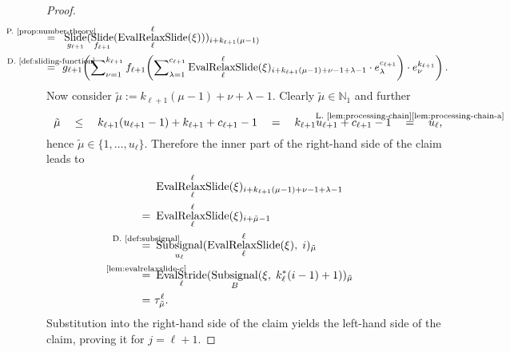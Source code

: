 \documentclass[journal]{IEEEtran}
\newcommand{\N}{\mathbb{N}}
\newcommand{\ROI}{B}
\newcommand{\discint}[2]{\{#1,\dotsc,#2\}}
\newcommand{\inint}[2]{\in\discint{#1}{#2}}
\DeclareMathOperator{\Subsignal}{Subsignal}
\DeclareMathOperator{\Slide}{Slide}
\DeclareMathOperator{\EvalStride}{EvalStride}
\newcommand{\equsing}[1]{\overset{\mathclap{\text{#1}}}{=}}
\DeclareMathOperator{\EvalRelaxSlide}{EvalRelaxSlide}
\begin{document}
\begin{proof}
\begin{align*}
  \equsing{P.~\ref{prop:number-theory}}\ \ & \Slide_{g_{\ell + 1}}(\Slide_{f_{\ell + 1}}(\EvalRelaxSlide_\ell^\ell(\xi)))_{i + k_{\ell + 1}(\mu - 1)}\\
    \equsing{D.~\ref{def:sliding-function}}\ \ & g_{\ell + 1}\!\left( \sum\nolimits_{\nu = 1}^{k_{\ell + 1}} f_{\ell + 1}\!\left( \sum\nolimits_{\lambda = 1}^{c_{\ell + 1}} \EvalRelaxSlide_\ell^\ell(\xi)_{i + k_{\ell + 1}(\mu - 1) + \nu - 1 + \lambda - 1}\cdot e_\lambda^{c_{\ell + 1}} \right) \cdot e_\nu^{k_{\ell + 1}} \right)\text{.}
\end{align*}
Now consider $\tilde{\mu} := k_{\ell + 1}(\mu - 1) + \nu + \lambda - 1$.
Clearly $\tilde{\mu}\in\N_1$ and further
\begin{displaymath}
  \tilde{\mu}
  \ \ \ \leq\ \ \ k_{\ell + 1}(u_{\ell + 1} - 1) + k_{\ell + 1} + c_{\ell + 1} - 1
  \ \ \ =\ \ \ k_{\ell + 1}u_{\ell + 1} + c_{\ell + 1} - 1
  \ \ \ \equsing{L.~\ref{lem:processing-chain}\ref{lem:processing-chain-a}}\ \ \ u_\ell\text{,}
\end{displaymath}
hence $\tilde{\mu}\inint{1}{u_\ell}$.
Therefore the inner part of the right-hand side of the claim leads to
\begin{align*}
  & \EvalRelaxSlide_\ell^\ell(\xi)_{i + k_{\ell + 1}(\mu - 1) + \nu - 1 + \lambda - 1}\\
  =\ & \EvalRelaxSlide_\ell^\ell(\xi)_{i + \tilde{\mu} - 1}\\
  \equsing{D.~\ref{def:subsignal}}\ & \Subsignal_{u_\ell}(\EvalRelaxSlide_\ell^\ell(\xi),\; i)_{\tilde{\mu}}\\
  \equsing{\ref{lem:evalrelaxslide-c}}\ & \EvalStride_\ell(\Subsignal_\ROI(\xi,\; k_\ell^*(i - 1) + 1))_{\tilde{\mu}}\\
  =\ & \tau^\ell_{\tilde{\mu}}\text{.}
\end{align*}
Substitution into the right-hand side of the claim yields the left-hand side of the claim, proving it for $j = \ell + 1$.


\end{proof}
\end{document}
